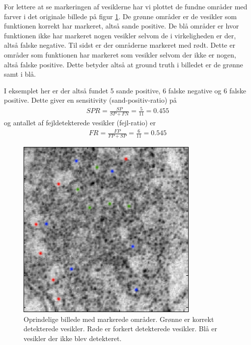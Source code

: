 For lettere at se markeringen af vesiklerne har vi plottet de fundne områder med farver i det originale billede på figur \ref{fig:postmethod_conv_photoshop}. De grønne områder er de vesikler som funktionen korrekt har markeret, altså sande positive. De blå områder er hvor funktionen ikke har markeret nogen vesikler selvom de i virkeligheden er der, altså falske negative. Til sidst er der områderne markeret med rødt. Dette er områder som funktionen har markeret som vesikler selvom der ikke er nogen, altså falske positive. Dette betyder altså at ground truth i billedet er de grønne samt i blå.

I eksemplet her er der altså fundet 5 sande positive, 6 falske negative og 6 falske positive. Dette giver en sensitivity (sand-positiv-ratio) på
\begin{align}
	SPR = \frac{SP}{SP+FN} = \frac{5}{11} = 0.455
\end{align}
og antallet af fejldetekterede vesikler (fejl-ratio) er
\begin{align}
	FR = \frac{FP}{FP+SP} = \frac{6}{11} = 0.545
\end{align}

\begin{figure}[H]
		\centering
		\includegraphics[scale=0.65]{files/postmethod/img/conv_5.png}
	\caption{Oprindelige billede med markerede områder. Grønne er korrekt detekterede vesikler. Røde er forkert detekterede vesikler. Blå er vesikler der ikke blev detekteret.\label{fig:postmethod_conv_photoshop}}
\end{figure}

